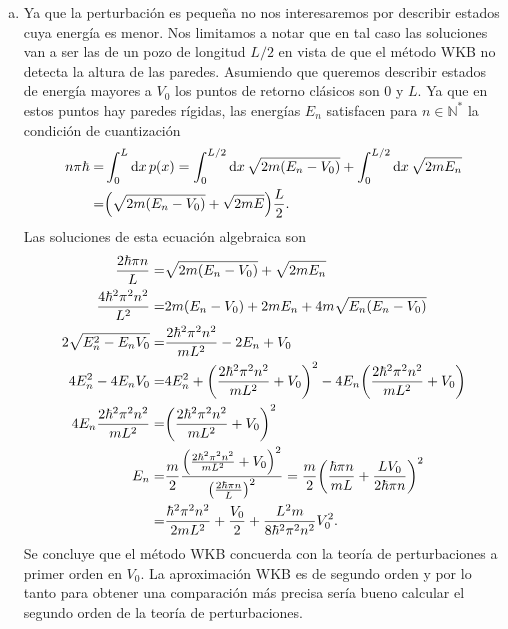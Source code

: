 \documentclass{article}
\begin{document}
\begin{enumerate}[1)]
\begin{enumerate}[a)]
\item Ya que la perturbación es pequeña no nos interesaremos por describir estados cuya energía es menor. Nos limitamos a notar que en tal caso las soluciones van a ser las de un pozo de longitud $L/2$ en vista de que el método WKB no detecta la altura de las paredes. Asumiendo que queremos describir estados de energía mayores a $V_0$ los puntos de retorno clásicos son $0$ y $L$. Ya que en estos puntos hay paredes rígidas, las energías $E_n$ satisfacen para $n\in\mathbb{N}^*$ la condición de cuantización
\begin{align}
\begin{split}
n\pi\hbar=&\int_0^L\dd{x}p(x)=\int_0^{L/2}\dd{x}\sqrt{2m(E_n-V_0)}+\int_0^{L/2}\dd{x}\sqrt{2mE_n}\\
=&\qty(\sqrt{2m(E_n-V_0)}+\sqrt{2mE})\frac{L}{2}.
\end{split}
\end{align}
Las soluciones de esta ecuación algebraica son
\begin{align}
\begin{split}
\frac{2\hbar\pi n}{L}=&\sqrt{2m(E_n-V_0)}+\sqrt{2mE_n}\\
\frac{4\hbar^2\pi^2 n^2}{L^2}=&2m(E_n-V_0)+2mE_n+4m\sqrt{E_n(E_n-V_0)}\\
2\sqrt{E_n^2-E_nV_0}=&\frac{2\hbar^2\pi^2 n^2}{mL^2}-2E_n+V_0\\
4E_n^2-4E_nV_0=&4E_n^2+\qty(\frac{2\hbar^2\pi^2 n^2}{mL^2}+V_0)^2-4E_n\qty(\frac{2\hbar^2\pi^2 n^2}{mL^2}+V_0)\\
4E_n\frac{2\hbar^2\pi^2 n^2}{mL^2}=&\qty(\frac{2\hbar^2\pi^2 n^2}{mL^2}+V_0)^2\\
E_n=&\frac{m}{2}\frac{\qty(\frac{2\hbar^2\pi^2 n^2}{mL^2}+V_0)^2}{\qty(\frac{2\hbar\pi n}{L})^2}=\frac{m}{2}\qty(\frac{\hbar\pi n}{mL}+\frac{LV_0}{2\hbar\pi n})^2\\
=&\frac{\hbar^2\pi^2 n^2}{2mL^2}+\frac{V_0}{2}+\frac{L^2m}{8\hbar^2\pi^2n^2}V_0^2.
\end{split}
\end{align}
Se concluye que el método WKB concuerda con la teoría de perturbaciones a primer orden en $V_0$. La aproximación WKB es de segundo orden y por lo tanto para obtener una comparación más precisa sería bueno calcular el segundo orden de la teoría de perturbaciones.

\end{enumerate}


\end{enumerate}
\end{document}
